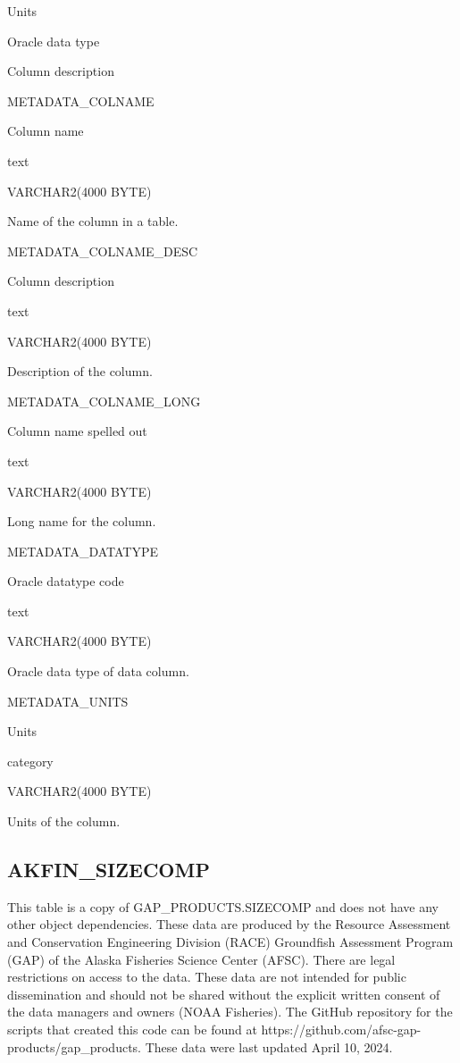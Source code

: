 \documentclass[
  letterpaper,
  oneside,
  open=any]{scrbook}
\begin{document}
Units

Oracle data type

Column description

METADATA\_COLNAME

Column name

text

VARCHAR2(4000 BYTE)

Name of the column in a table.

METADATA\_COLNAME\_DESC

Column description

text

VARCHAR2(4000 BYTE)

Description of the column.

METADATA\_COLNAME\_LONG

Column name spelled out

text

VARCHAR2(4000 BYTE)

Long name for the column.

METADATA\_DATATYPE

Oracle datatype code

text

VARCHAR2(4000 BYTE)

Oracle data type of data column.

METADATA\_UNITS

Units

category

VARCHAR2(4000 BYTE)

Units of the column.

\hypertarget{akfin_sizecomp}{%
\subsection{AKFIN\_SIZECOMP}\label{akfin_sizecomp}}

This table is a copy of GAP\_PRODUCTS.SIZECOMP and does not have any
other object dependencies. These data are produced by the Resource
Assessment and Conservation Engineering Division (RACE) Groundfish
Assessment Program (GAP) of the Alaska Fisheries Science Center (AFSC).
There are legal restrictions on access to the data. These data are not
intended for public dissemination and should not be shared without the
explicit written consent of the data managers and owners (NOAA
Fisheries). The GitHub repository for the scripts that created this code
can be found at https://github.com/afsc-gap-products/gap\_products.
These data were last updated April 10, 2024.
\end{document}
